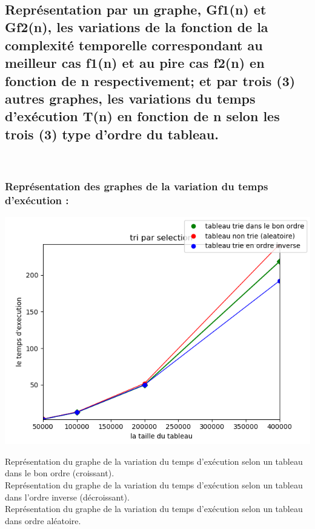 \documentclass[12pt]{article}
\begin{document}
\textrm{  }
\\
\color{black}





\subsection{Représentation par un graphe, Gf1(n) et Gf2(n), les variations de la fonction de la complexité temporelle correspondant au meilleur cas f1(n) et au pire cas f2(n) en fonction de n respectivement; et par trois (3) autres graphes,  les variations  du temps d'exécution T(n) en fonction de n selon les trois (3) type d'ordre du tableau.}
\texttt{  }\\

\subsubsection{Représentation des graphes de la variation du temps d'exécution :}


\includegraphics[width=1\textwidth]{graphe/Tri_selection.png}

Représentation du graphe de la variation du temps d'exécution selon un tableau dans le bon ordre (croissant).\\

Représentation du graphe de la variation du temps d'exécution selon un tableau dans l'ordre inverse (décroissant).\\

Représentation du graphe de la variation du temps d'exécution selon un tableau dans ordre aléatoire.
\end{document}

